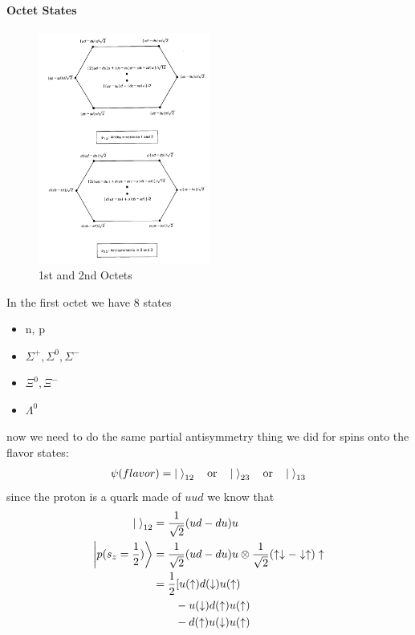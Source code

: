 \documentclass[../main.tex]{subfiles}
\begin{document}
\begin{itemize}
    \paragraph*{Octet States} 
    \begin{figure}[ht]
        \centering
        \includegraphics[width=0.5\textwidth]{2octets.png}
        \caption{1st and 2nd Octets}
        \label{fig:octet}
    \end{figure}
    In the first octet we have 8 states
    \begin{itemize}
        \item n, p 
        \item $\Sigma^+, \Sigma^0, \Sigma^-$
        \item $\Xi^0, \Xi^-$
        \item $\Lambda^0$
    \end{itemize}
    now we need to do the same partial antisymmetry thing we did for spins onto the flavor states:
    \begin{align*}
        \psi(flavor) = \ket{\;}_{12} \qor \ket{\;}_{23} \qor \ket{\;}_{13}
    \end{align*}
    since the proton is a quark made of $uud$ we know that
    \begin{align*}
        \ket{\;}_{12} &= \frac{1}{\sqrt{2}} (ud - du)u \\
        \ket{p(s_z = \ohf)} &= \frac{1}{\sqrt{2}} (ud - du)u \otimes \frac{1}{\sqrt{2}} (\ua\da - \da\ua)\ua \\
        &= \frac{1}{2} [u(\ua) d(\da) u(\ua) \\
        &\qquad - u(\da) d(\ua) u(\ua) \\
        &\qquad - d(\ua) u(\da) u(\ua) \\

\end{align*}
\end{itemize}
\end{document}
